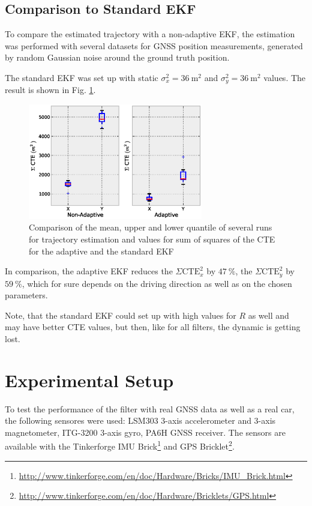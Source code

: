\documentclass[conference]{IEEEtran}
\begin{document}
\subsection{Comparison to Standard EKF}

To compare the estimated trajectory with a non-adaptive EKF, the estimation was performed with several datasets for GNSS position measurements, generated by random Gaussian noise around the ground truth position.

The standard EKF was set up with static $\sigma_x^2=\SI{36}{\square\metre}$ and $\sigma_y^2=\SI{36}{\square\metre}$ values. The result is shown in Fig.  \ref{Boxplot}.

\begin{figure}[ht]
\centering
\includegraphics[width=3.0in]{images/CTE-Adaptive-NonAdaptive-Boxplot}
\caption{Comparison of the mean, upper and lower quantile of several runs for trajectory estimation and values for sum of squares of the CTE for the adaptive and the standard EKF}
\label{Boxplot}
\end{figure}

In comparison, the adaptive EKF reduces the $\Sigma \text{CTE}_x^2$ by $\SI{47}{\percent}$, the $\Sigma \text{CTE}_y^2$ by $\SI{59}{\percent}$, which for sure depends on the driving direction as well as on the chosen parameters.

Note, that the standard EKF could set up with high values for $R$ as well and may have better CTE values, but then, like for all filters, the dynamic is getting lost.

\section{Experimental Setup}

To test the performance of the filter with real GNSS data as well as a real car, the following sensores were used: LSM303   3-axis accelerometer and 3-axis magnetometer, ITG-3200 3-axis gyro, PA6H GNSS receiver. The sensors are available with the Tinkerforge IMU Brick\footnote{\url{http://www.tinkerforge.com/en/doc/Hardware/Bricks/IMU_Brick.html}} and GPS Bricklet\footnote{\url{http://www.tinkerforge.com/en/doc/Hardware/Bricklets/GPS.html}}.
\end{document}
